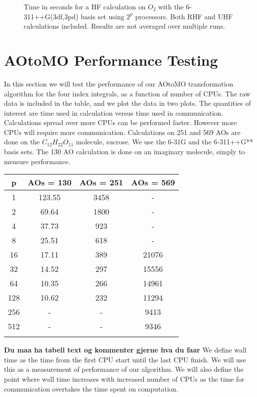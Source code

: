 \begin{figure}[h!]
\begin{center}
\caption{Time in seconds for a HF calculation on $O_2$ with the 6-311++G(3df,3pd) basis set using $2^p$ processors. Both RHF and UHF calculations included. Results are not averaged over multiple runs.}
\label{fig:hf_performance_stuff_jesus1234}
\end{center}
\end{figure}


\section{AOtoMO Performance Testing \label{aotomoperformancetesting}}
In this section we will test the performance of our AOtoMO
transformation algorithm for the four index integrals, as a function
of number of CPUs. The raw data is included in the table, and we plot
the data in two plots. The quantities of interest are time used in
calculation versus time used in communication. Calculations spread
over more CPUs can be performed faster. However more CPUs will require
more communication. Calculations on 251 and 569 AOs are done on the
$C_{12} H_{22} O_{11}$ molecule, sucrose. We use the 6-31G and the
6-311++G** basis sets. The 130 AO calculation is done on an imaginary
molecule, simply to measure performance. \\

 \begin{center}
  \begin{tabular}{ c  c  c  c }
  \hline
     p & AOs = 130 & AOs = 251 & AOs = 569  \\ \hline
     1 & 123.55 & 3458  & - \\
     2 & 69.64 & 1800  & - \\
	 4 & 37.73 & 923  & -  \\
     8 & 25.51 & 618  & -  \\
    16 & 17.11 & 389  & 21076 \\
    32 & 14.52 & 297  & 15556 \\
    64 & 10.35 & 266  & 14961 \\
    128 & 10.62 & 232  & 11294
\\
    256 & - & -  & 9413
\\
    512 & - & -  & 9346
    
     \\ \hline \\
  \end{tabular} 
\end{center} 
{\bf Du maa ha tabell text og kommenter gjerne hva du faar} We define
wall time as the time from the first CPU start until the last CPU
finish. We will use this as a measurement of performance of our
algorithm. We will also define the point where wall time increases with
increased number of CPUs as the time for communication overtakes
the time spent on computation. \\

